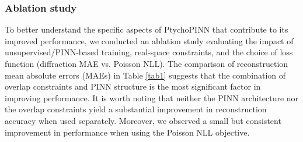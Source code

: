 \documentclass[sn-mathphys]{sn-jnl}%
\theoremstyle{thmstyleone}%
\theoremstyle{thmstyletwo}%
\theoremstyle{thmstylethree}%
\begin{document}

\subsubsection{Ablation study}
To better understand the specific aspects of PtychoPINN that contribute to its improved performance, we conducted an ablation study evaluating the impact of unsupervised/PINN-based training, real-space constraints, and the choice of loss function (diffraction MAE vs. Poisson NLL). The comparison of reconstruction mean absolute errors (MAEs) in Table \ref{tab1} suggests that the combination of overlap constraints and PINN structure is the most significant factor in improving performance. It is worth noting that neither the PINN architecture nor the overlap constraints yield a substantial improvement in reconstruction accuracy when used separately. Moreover, we observed a small but consistent improvement in performance when using the Poisson NLL objective.

\end{document}
